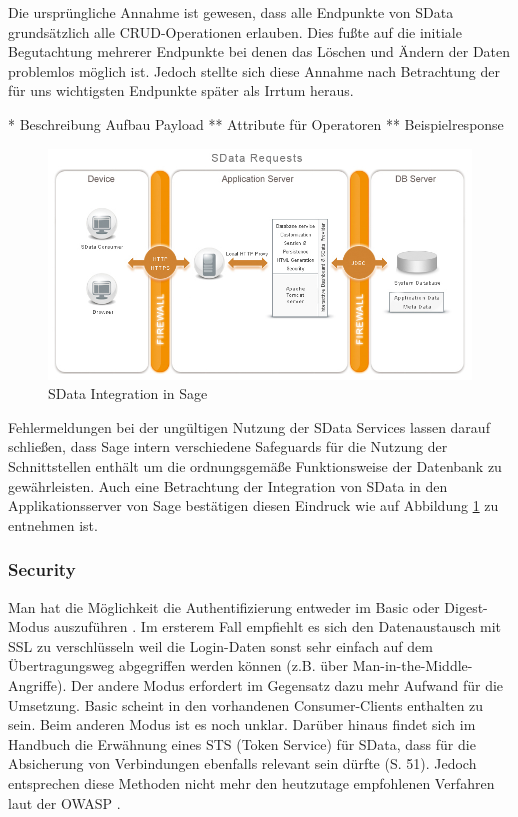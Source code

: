 Die ursprüngliche Annahme ist gewesen, dass alle Endpunkte von SData grundsätzlich alle CRUD-Operationen erlauben. Dies fußte auf die initiale Begutachtung mehrerer Endpunkte bei denen das Löschen und Ändern der Daten problemlos möglich ist. Jedoch stellte sich diese Annahme nach Betrachtung der für uns wichtigsten Endpunkte später als Irrtum heraus.

* Beschreibung Aufbau Payload
** Attribute für Operatoren
** Beispielresponse

\begin{figure}[!h]
\centering
\includegraphics[width=12cm]{images/0x_requirement_analysis/sdata_requests_arch.png}
\caption{SData Integration in Sage~\cite{sdata_requests}}
\label{fig:sdataintegrationsage}
\end{figure}

Fehlermeldungen bei der ungültigen Nutzung der SData Services lassen darauf schließen, dass Sage intern verschiedene Safeguards für die Nutzung der Schnittstellen enthält um die ordnungsgemäße Funktionsweise der Datenbank zu gewährleisten. Auch eine Betrachtung der Integration von SData in den Applikationsserver von Sage bestätigen diesen Eindruck wie auf Abbildung \ref{fig:sdataintegrationsage} zu entnehmen ist.

\subsubsection*{Security}

Man hat die Möglichkeit die Authentifizierung entweder im Basic oder Digest-Modus auszuführen \cite{sdatadocu_auth}. Im ersterem Fall empfiehlt es sich den Datenaustausch mit SSL zu verschlüsseln weil die Login-Daten sonst sehr einfach auf dem Übertragungsweg abgegriffen werden können (z.B. über Man-in-the-Middle-Angriffe). Der andere Modus erfordert im Gegensatz dazu mehr Aufwand für die Umsetzung. Basic scheint in den vorhandenen Consumer-Clients enthalten zu sein. Beim anderen Modus ist es noch unklar.
Darüber hinaus findet sich im Handbuch die Erwähnung eines STS (Token Service) für SData, dass für die Absicherung von Verbindungen ebenfalls relevant sein dürfte \cite{sageadministrationshandbuch} (S. 51). Jedoch entsprechen diese Methoden nicht mehr den heutzutage empfohlenen Verfahren laut der OWASP \cite{owasp_authentication}.

